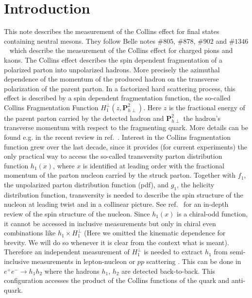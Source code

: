 \section{Introduction}

This note describes the measurement of the Collins effect for final states containing neutral mesons. They follow Belle notes $\#805$, $\#878$, $\#902$ and $\#1346$~\cite{BelleNote1,BelleNote2,BelleNote3,BelleNote4} which describe the measurement of the Collins effect for charged pions and kaons. 
The Collins effect describes the spin dependent fragmentation of a polarized parton into unpolarized hadrons. More precisely the azimuthal dependence of the momentum of the produced hadron on the transverse polarization of the parent parton. 
In a factorized hard scattering process, this effect is described by a spin dependent fragmentation function, the so-called Collins Fragmentation Function $H^{\perp}_1(z,\boldsymbol{P}^2_{h\perp})$. Here $z$ is the fractional energy of the parent parton carried by the detected hadron and $\boldsymbol{P}^2_{h\perp}$ the hadron's transverse momentum with respect to the fragmenting quark. More details can be found e.g. in the recent review in ref.~\cite{Metz:2016swz}. Interest in the Collins fragmentation function grew over the last decade, since it provides (for current experiments) the only practical way to access the so-called transversity parton distribution function $h_1(x)$, where $x$ is identified at leading order with the fractional momentum of the parton nucleon carried by the struck parton.  Together with $f_1$, the unpolarized parton distribution function (pdf), and $g_1$, the helicity distribution function,  transversity is needed to describe the spin structure of the nucleon at leading twist and in a collinear picture. See ref.~\cite{Aidala:2012mv} for an in-depth review of the spin structure of the nucleon. 
Since $h_1(x)$ is a chiral-odd function, it cannot be accessed in inclusive measurements but only in chiral even combinations like $h_1 \times H^\perp_1$ (Here we omitted the kinematic dependence for brevity. We will do so whenever it is clear from the context what is meant). Therefore an independent measurement of $H^\perp_1$ is needed to extract $h_1$ from semi-inclusive measurements in lepton-nucleon or $pp$ scattering . This can be done in $e^+e^-\rightarrow h_1 h_2$ where the hadrons $h_1$, $h_2$ are detected back-to-back. This configuration accesses the product of the Collins functions of the quark and anti-quark. 

